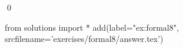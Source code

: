 
\begin{ex} 
  \label{ex:formal8}
  
  \qed
\end{ex} 
\begin{python0}
from solutions import *
add(label="ex:formal8",
    srcfilename='exercises/formal8/answer.tex') 
\end{python0}
